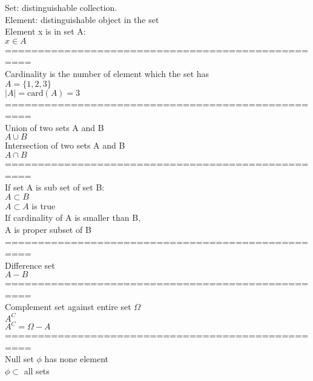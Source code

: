 \documentclass{article}
\begin{document}
Set: distinguishable collection. \\ 
Element: distinguishable object in the set \\ 

Element x is in set A: \\ 
$x\in A$ \\ 

================================================== \\
Cardinality is the number of element which the set has \\ 

$A=\{1,2,3\}$ \\ 
$|A| = \text{card}(A) = 3$ \\ 

================================================== \\
Union of two sets A and B \\ 
$A\cup B$ \\ 

Intersection of two sets A and B \\ 
$A\cap B$ \\ 

================================================== \\
If set A is sub set of set B: \\ 
$A \subset B$ \\ 

$A \subset A$ is true \\

If cardinality of A is smaller than B, \\ 
A is proper subset of B \\ 

================================================== \\
Difference set \\ 
$A-B$ \\ 

================================================== \\
Complement set against entire set $\Omega$ \\ 
$A^C$ \\ 

$A^C=\Omega-A$ \\ 

================================================== \\
Null set $\phi$ has none element \\ 

$\phi \subset$ all sets \\ 
\end{document}
